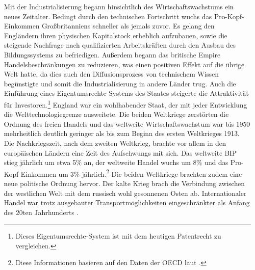 Mit der Industrialisierung begann hinsichtlich des Wirtschaftswachstums ein neues Zeitalter. Bedingt durch den technischen Fortschritt wuchs das Pro-Kopf-Einkommen Großbritanniens schneller als jemals zuvor. Es gelang den Engländern ihren physischen Kapitalstock erheblich aufzubauen, sowie die steigende Nachfrage nach qualifizierten Arbeitskräften durch den Ausbau des Bildungssystems zu befriedigen. Außerdem begann das britische Empire Handelsbeschränkungen zu reduzieren, was einen positiven Effekt auf die übrige Welt hatte, da dies auch den Diffusionsprozess von technischem Wissen begünstigte und somit die Industrialisierung in andere Länder trug. Auch die Einführung eines Eigentumsrechte-Systems des Staates steigerte die Attraktivität für Investoren.\footnote{Dieses Eigentumsrechte-System ist mit dem heutigen Patentrecht zu vergleichen.} England war ein wohlhabender Staat, der mit jeder Entwicklung die Welttechnologiegrenze ausweitete. \newline Die beiden Weltkriege zerstörten die Ordnung des freien Handels und das weltweite Wirtschaftswachstum war bis 1950 mehrheitlich deutlich geringer als bis zum Beginn des ersten Weltkrieges 1913. Die Nachkriegszeit, nach dem zweiten Weltkrieg, brachte vor allem in den europäischen Ländern eine Zeit des Aufschwungs mit sich. Das weltweite BIP stieg jährlich um etwa 5{\%} an, der weltweite Handel wuchs um 8{\%} und das Pro-Kopf Einkommen um 3{\%} jährlich.\footnote{Diese Informationen basieren auf den Daten der OECD laut \citet{Maddison.2001}.} Die beiden Weltkriege brachten zudem eine neue politische Ordnung hervor. Der kalte Krieg brach die Verbindung zwischen der westlichen Welt mit dem russisch wohl gesonnenen Osten ab. Internationaler Handel war trotz ausgebauter Transportmöglichkeiten eingeschränkter als Anfang des 20ten Jahrhunderts \citep{Maddison.2001}.\\


